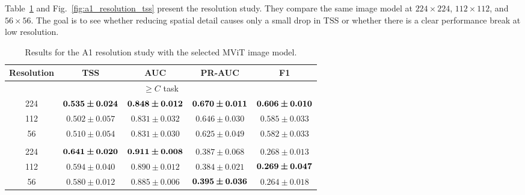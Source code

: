 Table~\ref{tab:single} and Fig.~\ref{fig:a1_resolution_tss} present the resolution study. They compare the same image model at $224 \times 224$, $112 \times 112$, and $56 \times 56$. The goal is to see whether reducing spatial detail causes only a small drop in TSS or whether there is a clear performance break at low resolution.

\begin{table}[H]
\caption{Results for the A1 resolution study with the selected MViT image model.}
\label{tab:single}
\centering
\small
\renewcommand{\arraystretch}{1.15}
\setlength{\tabcolsep}{7pt}
\begin{tabular}{@{}ccccc@{}}
\toprule
Resolution & TSS & AUC & PR-AUC & F1 \\
\midrule
\multicolumn{5}{c}{$\geq C$ task} \\
\midrule
224 & $\bm{0.535 \pm 0.024}$ & $\bm{0.848 \pm 0.012}$ & $\bm{0.670 \pm 0.011}$ & $\bm{0.606 \pm 0.010}$ \\
112 & $0.502 \pm 0.057$ & $0.831 \pm 0.032$ & $0.646 \pm 0.030$ & $0.585 \pm 0.033$ \\
56 & $0.510 \pm 0.054$ & $0.831 \pm 0.030$ & $0.625 \pm 0.049$ & $0.582 \pm 0.033$ \\
\addlinespace
\multicolumn{5}{c}{$\geq M$ task} \\
\midrule
224 & $\bm{0.641 \pm 0.020}$ & $\bm{0.911 \pm 0.008}$ & $0.387 \pm 0.068$ & $0.268 \pm 0.013$ \\
112 & $0.594 \pm 0.040$ & $0.890 \pm 0.012$ & $0.384 \pm 0.021$ & $\bm{0.269 \pm 0.047}$ \\
56 & $0.580 \pm 0.012$ & $0.885 \pm 0.006$ & $\bm{0.395 \pm 0.036}$ & $0.264 \pm 0.018$ \\
\bottomrule
\end{tabular}
\end{table}

